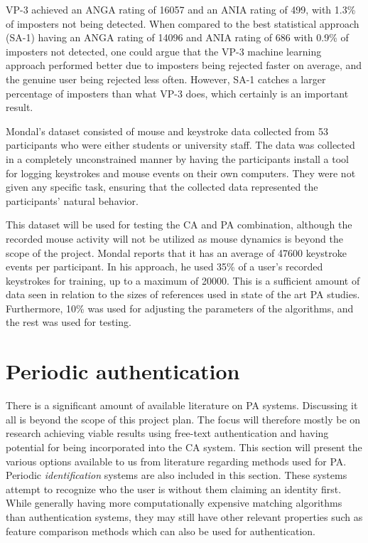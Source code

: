 \documentclass[informationsecurity]{gucmasterproject}
\begin{document}
VP-3 achieved an ANGA rating of 16057 and an ANIA rating of 499, with 1.3\% of imposters not being detected.
When compared to the best statistical approach (SA-1) having an ANGA rating of 14096 and ANIA rating of 686 with 0.9\% of imposters not detected, one could argue that the VP-3 machine learning approach performed better due to imposters being rejected faster on average, and the genuine user being rejected less often.
However, SA-1 catches a larger percentage of imposters than what VP-3 does, which certainly is an important result.

Mondal's dataset consisted of mouse and keystroke data collected from 53 participants who were either students or university staff.
The data was collected in a completely unconstrained manner by having the participants install a tool for logging keystrokes and mouse events on their own computers.
They were not given any specific task, ensuring that the collected data represented the participants' natural behavior.

This dataset will be used for testing the CA and PA combination, although the recorded mouse activity will not be utilized as mouse dynamics is beyond the scope of the project.
Mondal reports that it has an average of 47600 keystroke events per participant. 
In his approach, he used 35\% of a user's recorded keystrokes for training, up to a maximum of 20000.
This is a sufficient amount of data seen in relation to the sizes of references used in state of the art PA studies.
Furthermore, 10\% was used for adjusting the parameters of the algorithms, and the rest was used for testing.


\section{Periodic authentication}
\label{sec:related-other}
There is a significant amount of available literature on PA systems.
Discussing it all is beyond the scope of this project plan. The focus will therefore mostly be on research achieving viable results using free-text authentication and having potential for being incorporated into the CA system.
This section will present the various options available to us from literature regarding methods used for PA.
Periodic \textit{identification} systems are also included in this section.
These systems attempt to recognize who the user is without them claiming an identity first.
While generally having more computationally expensive matching algorithms than authentication systems, they may still have other relevant properties such as feature comparison methods which can also be used for authentication.
\end{document}
